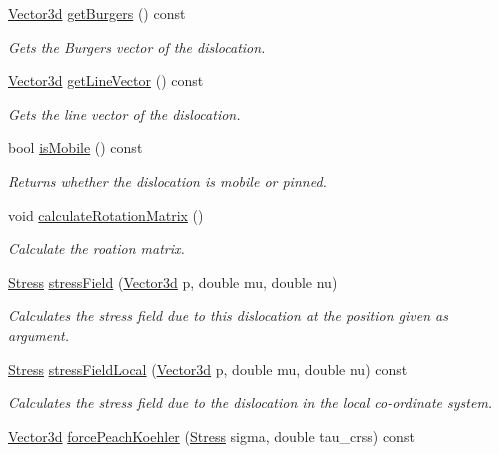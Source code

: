 \begin{DoxyCompactItemize}
\hyperlink{classVector3d}{Vector3d} \hyperlink{classDislocation_a9eb3cc78d08d26a29d5f318a33f6065e}{get\-Burgers} () const 
\begin{DoxyCompactList}\small\item\em Gets the Burgers vector of the dislocation. \end{DoxyCompactList}\item 
\hyperlink{classVector3d}{Vector3d} \hyperlink{classDislocation_a8ba2d0d68c7b335e5c75b7498b33803d}{get\-Line\-Vector} () const 
\begin{DoxyCompactList}\small\item\em Gets the line vector of the dislocation. \end{DoxyCompactList}\item 
bool \hyperlink{classDislocation_a741fe1113b1693a6b2f3ad364e9508fe}{is\-Mobile} () const 
\begin{DoxyCompactList}\small\item\em Returns whether the dislocation is mobile or pinned. \end{DoxyCompactList}\item 
void \hyperlink{classDislocation_aa249f1f46486fd183757ed5049586e73}{calculate\-Rotation\-Matrix} ()
\begin{DoxyCompactList}\small\item\em Calculate the roation matrix. \end{DoxyCompactList}\item 
\hyperlink{classStress}{Stress} \hyperlink{classDislocation_af61cedf5305080ce0f55eb7177efe529}{stress\-Field} (\hyperlink{classVector3d}{Vector3d} p, double mu, double nu)
\begin{DoxyCompactList}\small\item\em Calculates the stress field due to this dislocation at the position given as argument. \end{DoxyCompactList}\item 
\hyperlink{classStress}{Stress} \hyperlink{classDislocation_a26f938bfb630c3ba1b13522d7a422b8c}{stress\-Field\-Local} (\hyperlink{classVector3d}{Vector3d} p, double mu, double nu) const 
\begin{DoxyCompactList}\small\item\em Calculates the stress field due to the dislocation in the local co-\/ordinate system. \end{DoxyCompactList}\item 
\hyperlink{classVector3d}{Vector3d} \hyperlink{classDislocation_a9ca3f6fb280edaa1fbf156d75b8f0527}{force\-Peach\-Koehler} (\hyperlink{classStress}{Stress} sigma, double tau\-\_\-crss) const 

\end{DoxyCompactItemize}
